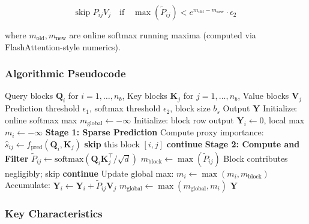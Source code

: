 \[
\text{skip } P_{ij} V_j \quad \text{if} \quad \max(\tilde{P}_{ij}) < e^{m_{\text{old}} - m_{\text{new}}} \cdot \epsilon_2
\]

where $m_{\text{old}}, m_{\text{new}}$ are online softmax running maxima (computed via FlashAttention-style numerics).

\subsubsection{Algorithmic Pseudocode}

\begin{algorithm}[H]
\caption{SpargeAttn: Two-Stage Block-Sparse Filtering}
\begin{algorithmic}[1]
\Require Query blocks $\mathbf{Q}_i$ for $i = 1, \ldots, n_b$, Key blocks $\mathbf{K}_j$ for $j = 1, \ldots, n_b$, Value blocks $\mathbf{V}_j$
\Require Prediction threshold $\epsilon_1$, softmax threshold $\epsilon_2$, block size $b_s$
\Ensure Output $\mathbf{Y}$
\State Initialize: online softmax max $m_{\text{global}} \gets -\infty$
    \State Initialize: block row output $\mathbf{Y}_i \gets 0$, local max $m_i \gets -\infty$
        \State \textbf{Stage 1: Sparse Prediction}
        \State Compute proxy importance: $\hat{s}_{ij} \gets f_{\text{pred}}(\mathbf{Q}_i, \mathbf{K}_j)$
            \State \textbf{skip} this block $[i,j]$  
            \State \textbf{continue} 
        \EndIf
        \State \textbf{Stage 2: Compute and Filter}
        \State $\tilde{P}_{ij} \gets \text{softmax}(\mathbf{Q}_i \mathbf{K}_j^\top / \sqrt{d})$
        \State $m_{\text{block}} \gets \max(\tilde{P}_{ij})$
            \State Block contributes negligibly; skip  
            \State \textbf{continue}
        \EndIf
        \State Update global max: $m_i \gets \max(m_i, m_{\text{block}})$
        \State Accumulate: $\mathbf{Y}_i \gets \mathbf{Y}_i + \tilde{P}_{ij} \mathbf{V}_j$
    \EndFor
    \State $m_{\text{global}} \gets \max(m_{\text{global}}, m_i)$
\EndFor
\Return $\mathbf{Y}$
\end{algorithmic}
\end{algorithm}

\subsubsection{Key Characteristics}

